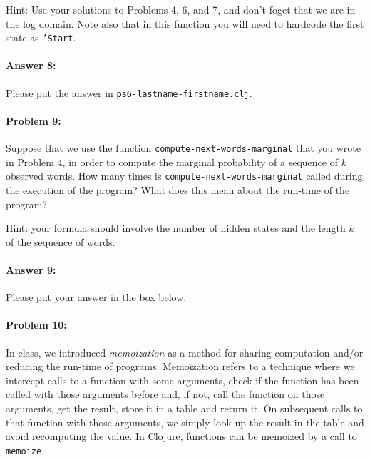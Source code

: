\documentclass[10pt]{article}
\newenvironment{AnswerBox}{\begin{mdframed}[style=simple]}{\end{mdframed}}
\newcommand{\PSnum}{6}
\begin{document}
Hint: Use your solutions to Problems 4, 6, and 7, and don't foget that
we are in the log domain. Note also that in this
function you will need to hardcode the first state as \texttt{'Start}.

\paragraph{Answer 8:} Please put the answer in
\texttt{ps\PSnum-lastname-firstname.clj}.

\hrulefill%

\paragraph{Problem 9:}
Suppose that we use the function \texttt{compute-next-words-marginal}
that you wrote in Problem 4, in order to compute the marginal
probability of a sequence of $k$ observed words. How many times is
\texttt{compute-next-words-marginal} called during the execution of the
program? What does this mean about the run-time of the program?

 Hint: your formula should involve the number of hidden
states and the length $k$ of the sequence of words.

\paragraph{Answer 9:} Please put your answer in the box below.

\begin{AnswerBox}%


\end{AnswerBox}%

\hrulefill%

\paragraph{Problem 10:}
In class, we introduced \emph{memoization} as a method for sharing
computation and/or reducing the run-time of programs. Memoization
refers to a technique where we intercept calls to a function with some
arguments, check if the function has been called with those arguments
before and, if not, call the function on those arguments, get the
result, store it in a table and return it. On subsequent calls to that
function with those arguments, we simply look up the result in the
table and avoid recomputing the value. In Clojure, functions can be
memoized by a call to \texttt{memoize}.
\end{document}
